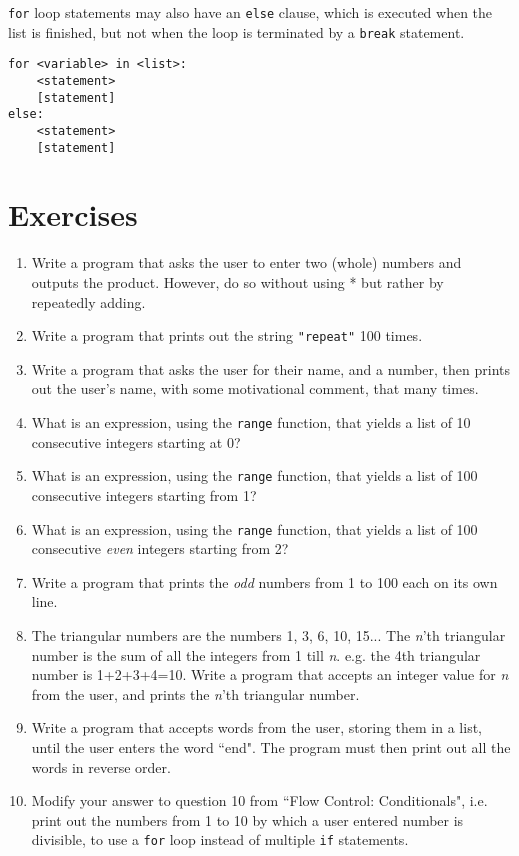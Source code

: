 \texttt{for} loop statements may also have an \texttt{else} clause, which is   executed when the list is finished, but not when the loop is   terminated by a \texttt{break} statement.
\begin{lstlisting}
for <variable> in <list>:
    <statement>
    [statement]
else:
    <statement>
    [statement]
\end{lstlisting}

\section{Exercises}
\begin{enumerate}
	\item Write a program that asks the user to enter two (whole) numbers and outputs the product. However, do so without using * but rather by repeatedly adding.
	\item Write a program that prints out the string \texttt{"repeat"} 100 times.
	\item Write a program that asks the user for their name, and a    number, then prints out the user's name, with some motivational comment, that many times.
	\item What is an expression, using the \texttt{range} function, that yields a    list of 10 consecutive integers starting at 0?
	\item What is an expression, using the \texttt{range} function, that yields a    list of 100 consecutive integers starting from 1?
	\item What is an expression, using the \texttt{range} function, that yields a    list of 100 consecutive \textit{even} integers starting    from 2?
	\item Write a program that prints the \textit{odd} numbers from 1 to 100 each on    its own line.
	\item The triangular numbers are the numbers 1, 3, 6, 10, 15... The \textit{n}'th triangular number is the sum of all the integers from 1 till \textit{n}. e.g. the 4th triangular number is 1+2+3+4=10. Write a program that accepts an integer value for \textit{n} from the user, and prints the \textit{n}'th triangular number.
	\item Write a program that accepts words from the user, storing them in a list, until the user enters the word ``end". The program must then print out all the words in reverse order.
	\item Modify your answer to question 10 from ``Flow Control:    Conditionals", i.e. print out the numbers from 1 to 10 by which a    user entered number is divisible, to use a \texttt{for} loop instead of    multiple \texttt{if} statements.

\end{enumerate}
